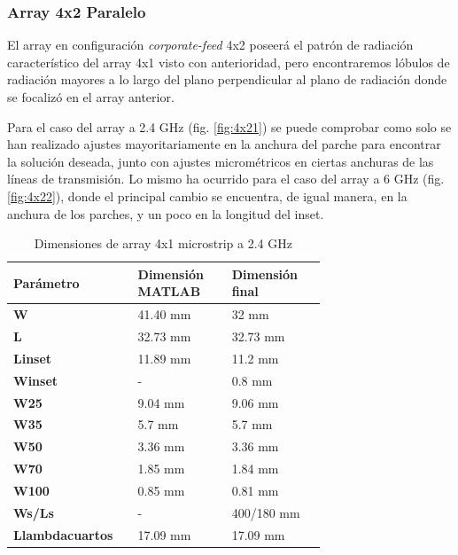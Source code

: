 \subsubsection{Array 4x2 Paralelo} 
\par El array en configuración \textit{corporate-feed} 4x2 poseerá el patrón de radiación característico del array 4x1 visto con anterioridad, pero encontraremos lóbulos de radiación mayores a lo largo del plano perpendicular al plano de radiación donde se focalizó en el array anterior. 
\\
\par Para el caso del array a 2.4 GHz (fig. \ref{fig:4x21}) se puede comprobar como solo se han realizado ajustes mayoritariamente en la anchura del parche para encontrar la solución deseada, junto con ajustes micrométricos en ciertas anchuras de las líneas de transmisión. Lo mismo ha ocurrido para el caso del array a 6 GHz (fig. \ref{fig:4x22}), donde el principal cambio se encuentra, de igual manera, en la anchura de los parches, y un poco en la longitud del inset.
\\
\begin{table}[H]
  

   \small %
   \centering %
   \begin{tabular}{m{0.2\linewidth}m{0.25\linewidth}m{0.25\linewidth}} %
   \toprule[\heavyrulewidth]\toprule[\heavyrulewidth]
   \textbf{Parámetro} & \textbf{Dimensión MATLAB} & \textbf{Dimensión final} \\ 
   \midrule
   \textbf{W} & 41.40 mm & 32 mm \\
   \textbf{L} & 32.73 mm & 32.73 mm\\
   \textbf{Linset} & 11.89 mm & 11.2 mm\\
   \textbf{Winset} & - & 0.8 mm\\
   \textbf{W25} & 9.04 mm & 9.06 mm\\
   \textbf{W35} & 5.7 mm & 5.7 mm\\
   \textbf{W50} & 3.36 mm & 3.36 mm\\
   \textbf{W70} & 1.85 mm & 1.84 mm\\
   \textbf{W100} & 0.85 mm & 0.81 mm\\
   \textbf{Ws/Ls} & - & 400/180 mm\\
   \textbf{Llambdacuartos} & 17.09 mm & 17.09 mm\\
   \bottomrule[\heavyrulewidth] 
   \end{tabular}
   \caption{Dimensiones de array 4x1 microstrip a 2.4 GHz} 
      \label{tab:array4x21}
\end{table}

